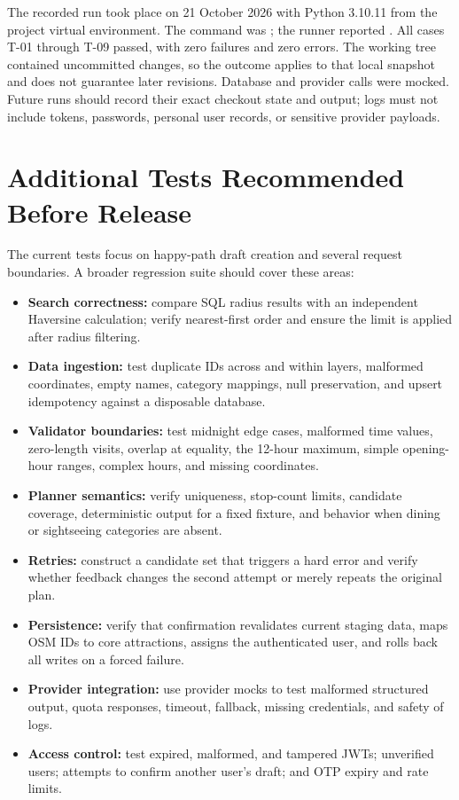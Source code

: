 The recorded run took place on 21 October 2026 with Python 3.10.11 from the project virtual environment. The command was ; the runner reported . All cases T-01 through T-09 passed, with zero failures and zero errors. The working tree contained uncommitted changes, so the outcome applies to that local snapshot and does not guarantee later revisions. Database and provider calls were mocked. Future runs should record their exact checkout state and output; logs must not include tokens, passwords, personal user records, or sensitive provider payloads.

\section{Additional Tests Recommended Before Release}

The current tests focus on happy-path draft creation and several request boundaries. A broader regression suite should cover these areas:
\begin{itemize}[leftmargin=1.8em,itemsep=3pt]
    \item \textbf{Search correctness:} compare SQL radius results with an independent Haversine calculation; verify nearest-first order and ensure the limit is applied after radius filtering.
    \item \textbf{Data ingestion:} test duplicate IDs across and within layers, malformed coordinates, empty names, category mappings, null preservation, and upsert idempotency against a disposable database.
    \item \textbf{Validator boundaries:} test midnight edge cases, malformed time values, zero-length visits, overlap at equality, the 12-hour maximum, simple opening-hour ranges, complex hours, and missing coordinates.
    \item \textbf{Planner semantics:} verify uniqueness, stop-count limits, candidate coverage, deterministic output for a fixed fixture, and behavior when dining or sightseeing categories are absent.
    \item \textbf{Retries:} construct a candidate set that triggers a hard error and verify whether feedback changes the second attempt or merely repeats the original plan.
    \item \textbf{Persistence:} verify that confirmation revalidates current staging data, maps OSM IDs to core attractions, assigns the authenticated user, and rolls back all writes on a forced failure.
    \item \textbf{Provider integration:} use provider mocks to test malformed structured output, quota responses, timeout, fallback, missing credentials, and safety of logs.
    \item \textbf{Access control:} test expired, malformed, and tampered JWTs; unverified users; attempts to confirm another user's draft; and OTP expiry and rate limits.
\end{itemize}

